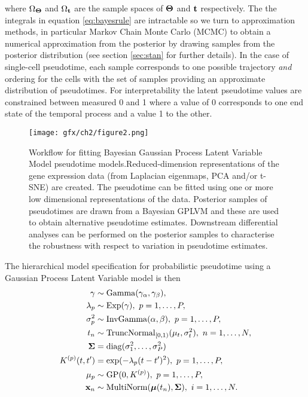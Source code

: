 where $\Omega_{\bm{\Theta}}$ and $\Omega_{\mathbf{t}}$ are the sample spaces of $\bm{\Theta}$ and $\mathbf{t}$ respectively. The the integrals in equation \ref{eq:bayesrule} are intractable so we turn to approximation methods, in particular Markov Chain Monte Carlo (MCMC) to obtain a numerical approximation from the posterior by drawing samples from the posterior distribution (see section \ref{sec:stan} for further details). In the case of single-cell pseudotime, each sample corresponds to one possible trajectory \emph{and} ordering for the cells with the set of samples providing an approximate distribution of pseudotimes. For interpretability the latent pseudotime values are constrained between measured 0 and 1 where a value of 0 corresponds to one end state of the temporal process and a value 1 to the other.

\begin{figure}
\centering
  \texttt{[image: gfx/ch2/figure2.png]}
  \caption{Workflow for fitting Bayesian Gaussian Process Latent Variable Model pseudotime models.Reduced-dimension representations of the gene expression data (from Laplacian eigenmaps, PCA and/or t-SNE) are created. The pseudotime can be fitted using one or more low dimensional representations of the data. Posterior samples of pseudotimes are drawn from a Bayesian GPLVM and these are used to obtain alternative pseudotime estimates. Downstream differential analyses can be performed on the posterior samples to characterise the robustness with respect to variation in pseudotime estimates.} \label{fig:workflow}
\end{figure}

The hierarchical model specification for probabilistic pseudotime using a Gaussian Process Latent Variable model is then
\begin{equation} \label{eq:model}
\begin{aligned}
	\gamma & \sim \mathrm{Gamma}(\gamma_\alpha, \gamma_\beta), \\
	\lambda_p & \sim  \mathrm{Exp(\gamma)}, ~p=1,\dots, P, \\
	 \sigma_p^2 & \sim   \mathrm{InvGamma}(\alpha, \beta), ~p=1,\dots, P, \\
	t_n & \sim
			\mathrm{TruncNormal}_{[0, 1)}(\mu_t, \sigma_t^2), ~n=1,\dots,N,\\
	{\bm \Sigma} & =  \mathrm{diag}(\sigma_1^2, \dots, \sigma_P^2) \\
	K^{(p)}(t, t') & = \exp( -\lambda_p (t-t')^2 ), ~p=1,\dots, P, \\
	\mu_p &\sim  \mathrm{GP}(0, K^{(p)}), ~ p=1,\dots,P,  \\
	\mathbf{x}_{n} & \sim  \mathrm{MultiNorm}( \bm{\mu}(t_n), \bm{\Sigma} ), ~i=1,\dots,N.
\end{aligned}
\end{equation}\label{eq:pseudogp_model}

